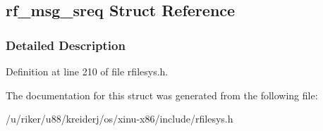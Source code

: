 \hypertarget{structrf__msg__sreq}{}\subsection{rf\+\_\+msg\+\_\+sreq Struct Reference}
\label{structrf__msg__sreq}


\subsubsection{Detailed Description}


Definition at line 210 of file rfilesys.\+h.



The documentation for this struct was generated from the following file\+:\begin{DoxyCompactItemize}
\item 
/u/riker/u88/kreiderj/os/xinu-\/x86/include/rfilesys.\+h\end{DoxyCompactItemize}

